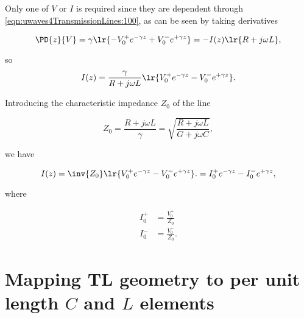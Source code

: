 Only one of \( V \) or \( I \) is required since they are dependent through \cref{eqn:uwaves4TransmissionLines:100}, as can be seen by taking derivatives

\begin{dmath}\label{eqn:uwaves4TransmissionLines:220}
\PD{z}{V} 
= \gamma \lr{ -V_0^{+} e^{-\gamma z} + V_0^{-} e^{+\gamma z} }
= 
-I(z) \lr{ R + j \omega L },
\end{dmath}

so
\begin{equation}\label{eqn:uwaves4TransmissionLines:240}
I(z) 
=
\frac{\gamma}{ R + j \omega L } \lr{ V_0^{+} e^{-\gamma z} - V_0^{-} e^{+\gamma z} }.
\end{equation}

Introducing the characteristic impedance \( Z_0 \) of the line

\begin{dmath}\label{eqn:uwaves4TransmissionLines:260}
Z_0 
= \frac{R + j \omega L}{\gamma} 
= \sqrt{ \frac{R + j \omega L}{G + j \omega C} },
\end{dmath}

we have

\begin{dmath}\label{eqn:uwaves4TransmissionLines:280}
I(z) 
=
\inv{Z_0} \lr{ V_0^{+} e^{-\gamma z} - V_0^{-} e^{+\gamma z} }.
=
I_0^{+} e^{-\gamma z} - I_0^{-} e^{+\gamma z},
\end{dmath}

where

\begin{equation}\label{eqn:uwaves4TransmissionLines:300}
\begin{aligned}
I_0^{+} &= \frac{V_0^{+}}{Z_0} \\
I_0^{-} &= \frac{V_0^{-}}{Z_0}.
\end{aligned}
\end{equation}

\section{Mapping TL geometry to per unit length \( C \) and \( L \) elements}


